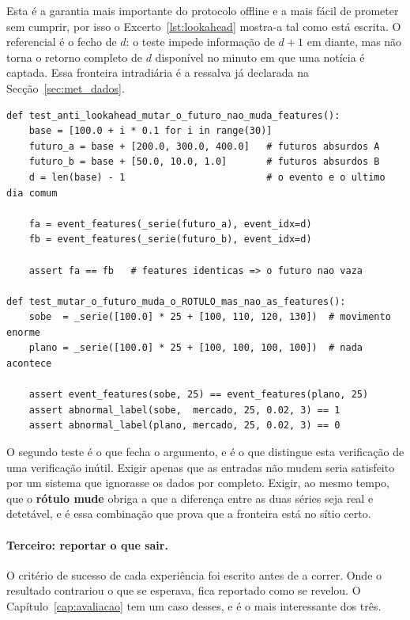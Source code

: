 Esta é a garantia mais importante do protocolo offline e a mais fácil de prometer sem cumprir, por
isso o Excerto~\ref{lst:lookahead} mostra-a tal como está escrita. O referencial é o fecho de $d$:
o teste impede informação de $d+1$ em diante, mas não torna o retorno completo de $d$ disponível no
minuto em que uma notícia é captada. Essa fronteira intradiária é a ressalva já declarada na
Secção~\ref{sec:met_dados}.

\begin{lstlisting}[label=lst:lookahead, caption={Os \textbf{dois} testes que impedem o futuro de entrar
nas entradas. O primeiro exige que duas séries com futuros diferentes dêem entradas iguais; o
segundo, que é o que fecha o argumento, exige ao mesmo tempo que o \emph{rótulo} mude.}]
def test_anti_lookahead_mutar_o_futuro_nao_muda_features():
    base = [100.0 + i * 0.1 for i in range(30)]
    futuro_a = base + [200.0, 300.0, 400.0]   # futuros absurdos A
    futuro_b = base + [50.0, 10.0, 1.0]       # futuros absurdos B
    d = len(base) - 1                         # o evento e o ultimo dia comum

    fa = event_features(_serie(futuro_a), event_idx=d)
    fb = event_features(_serie(futuro_b), event_idx=d)

    assert fa == fb   # features identicas => o futuro nao vaza

def test_mutar_o_futuro_muda_o_ROTULO_mas_nao_as_features():
    sobe  = _serie([100.0] * 25 + [100, 110, 120, 130])  # movimento enorme
    plano = _serie([100.0] * 25 + [100, 100, 100, 100])  # nada acontece

    assert event_features(sobe, 25) == event_features(plano, 25)
    assert abnormal_label(sobe,  mercado, 25, 0.02, 3) == 1
    assert abnormal_label(plano, mercado, 25, 0.02, 3) == 0
\end{lstlisting}

O segundo teste é o que fecha o argumento, e é o que distingue esta verificação de uma verificação
inútil. Exigir apenas que as entradas não mudem seria satisfeito por um sistema que
ignorasse os dados por completo. Exigir, ao mesmo tempo, que o \textbf{rótulo mude} obriga a que a
diferença entre as duas séries seja real e detetável, e é essa combinação que prova que a fronteira
está no sítio certo.

\paragraph{Terceiro: reportar o que sair.}
O critério de sucesso de cada experiência foi escrito antes de a correr. Onde o resultado contrariou
o que se esperava, fica reportado como se revelou. O Capítulo~\ref{cap:avaliacao} tem um caso desses,
e é o mais interessante dos três.

